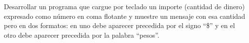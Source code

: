Desarrollar un programa que cargue por teclado un importe (cantidad de dinero) expresado como número en coma flotante y muestre un mensaje con esa cantidad pero en dos formatos: en uno debe aparecer precedida por el signo ``\$'' y en el otro debe aparecer precedida por la palabra ``pesos''. 

